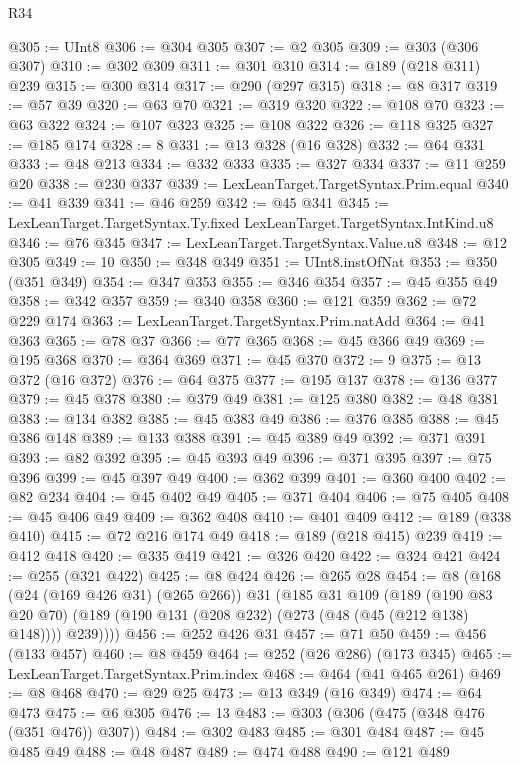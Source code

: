 \begin{lexlean}{R34}
\begin{coremodule}
@305 := UInt8
@306 := @304 @305
@307 := @2 @305
@309 := @303 (@306 @307)
@310 := @302 @309
@311 := @301 @310
@314 := @189 (@218 @311) @239
@315 := @300 @314
@317 := @290 (@297 @315)
@318 := @8 @317
@319 := @57 @39
@320 := @63 @70
@321 := @319 @320
@322 := @108 @70
@323 := @63 @322
@324 := @107 @323
@325 := @108 @322
@326 := @118 @325
@327 := @185 @174
@328 := 8
@331 := @13 @328 (@16 @328)
@332 := @64 @331
@333 := @48 @213
@334 := @332 @333
@335 := @327 @334
@337 := @11 @259 @20
@338 := @230 @337
@339 := LexLeanTarget.TargetSyntax.Prim.equal
@340 := @41 @339
@341 := @46 @259
@342 := @45 @341
@345 := LexLeanTarget.TargetSyntax.Ty.fixed LexLeanTarget.TargetSyntax.IntKind.u8
@346 := @76 @345
@347 := LexLeanTarget.TargetSyntax.Value.u8
@348 := @12 @305
@349 := 10
@350 := @348 @349
@351 := UInt8.instOfNat
@353 := @350 (@351 @349)
@354 := @347 @353
@355 := @346 @354
@357 := @45 @355 @49
@358 := @342 @357
@359 := @340 @358
@360 := @121 @359
@362 := @72 @229 @174
@363 := LexLeanTarget.TargetSyntax.Prim.natAdd
@364 := @41 @363
@365 := @78 @37
@366 := @77 @365
@368 := @45 @366 @49
@369 := @195 @368
@370 := @364 @369
@371 := @45 @370
@372 := 9
@375 := @13 @372 (@16 @372)
@376 := @64 @375
@377 := @195 @137
@378 := @136 @377
@379 := @45 @378
@380 := @379 @49
@381 := @125 @380
@382 := @48 @381
@383 := @134 @382
@385 := @45 @383 @49
@386 := @376 @385
@388 := @45 @386 @148
@389 := @133 @388
@391 := @45 @389 @49
@392 := @371 @391
@393 := @82 @392
@395 := @45 @393 @49
@396 := @371 @395
@397 := @75 @396
@399 := @45 @397 @49
@400 := @362 @399
@401 := @360 @400
@402 := @82 @234
@404 := @45 @402 @49
@405 := @371 @404
@406 := @75 @405
@408 := @45 @406 @49
@409 := @362 @408
@410 := @401 @409
@412 := @189 (@338 @410)
@415 := @72 @216 @174 @49
@418 := @189 (@218 @415) @239
@419 := @412 @418
@420 := @335 @419
@421 := @326 @420
@422 := @324 @421
@424 := @255 (@321 @422)
@425 := @8 @424
@426 := @265 @28
@454 := @8
    (@168
      (@24 (@169 @426 @31) (@265 @266))
      @31
      (@185
        @31
        @109
        (@189
          (@190 @83 @20 @70)
          (@189 (@190 @131 (@208 @232) (@273 (@48 (@45 (@212 @138) @148)))) @239))))
@456 := @252 @426 @31
@457 := @71 @50
@459 := @456 (@133 @457)
@460 := @8 @459
@464 := @252 (@26 @286) (@173 @345)
@465 := LexLeanTarget.TargetSyntax.Prim.index
@468 := @464 (@41 @465 @261)
@469 := @8 @468
@470 := @29 @25
@473 := @13 @349 (@16 @349)
@474 := @64 @473
@475 := @6 @305
@476 := 13
@483 := @303 (@306 (@475 (@348 @476 (@351 @476)) @307))
@484 := @302 @483
@485 := @301 @484
@487 := @45 @485 @49
@488 := @48 @487
@489 := @474 @488
@490 := @121 @489

\end{coremodule}
\end{lexlean}
